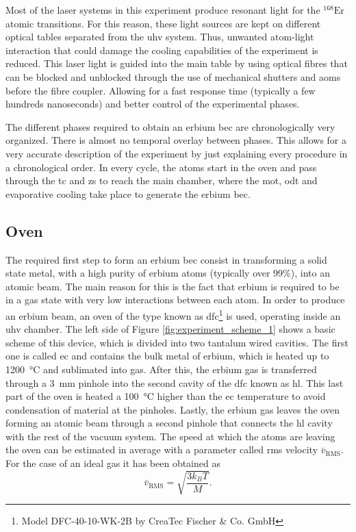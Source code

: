 Most of the laser systems in this experiment produce resonant light for the $^{\text{168}}\text{Er}$ atomic transitions. For this reason, these light sources are kept on different optical tables separated from the \ac{uhv} system. Thus, unwanted atom-light interaction that could damage the cooling capabilities of the experiment is reduced. This laser light is guided into the main table by using optical fibres that can be blocked and unblocked through the use of mechanical shutters and \acp{aom} before the fibre coupler. Allowing for a fast response time (typically a few hundreds nanoseconds) and better control of the experimental phases.

The different phases required to obtain an erbium \ac{bec} are chronologically very organized. There is almost no temporal overlay between phases. This allows for a very accurate description of the experiment by just explaining every procedure in a chronological order. In every cycle, the atoms start in the oven and pass through the \ac{tc} and \acf{zs} to reach the main chamber, where the \ac{mot}, \ac{odt} and evaporative cooling take place to generate the erbium \acl*{bec}.

\subsection{Oven}\label{subsec:oven}

The required first step to form an erbium \ac{bec} consist in transforming a solid state metal, with a high purity of erbium atoms (typically over 99\%), into an atomic beam. The main reason for this is the fact that erbium is required to be in a gas state with very low interactions between each atom. In order to produce an erbium beam, an oven of the type known as \Acf{dfc}\footnote{Model DFC-40-10-WK-2B by CreaTec Fischer \& Co. GmbH} is used, operating inside an \ac{uhv} chamber. The left side of Figure \ref{fig:experiment_scheme_1} shows a basic scheme of this device, which is divided into two tantalum wired cavities. The first one is called \Acf{ec} and contains the bulk metal of erbium, which is heated up to \SI{1200}{\degreeCelsius} and sublimated into gas. After this, the erbium gas is transferred through a \SI{3}{\milli\meter} pinhole into the second cavity of the \ac{dfc} known as \Acf{hl}. This last part of the oven is heated a \SI{100}{\degreeCelsius} higher than the \ac{ec} temperature to avoid condensation of material at the pinholes. Lastly, the erbium gas leaves the oven forming an atomic beam through a second pinhole that connects the \ac{hl} cavity with the rest of the vacuum system. The speed at which the atoms are leaving the oven can be estimated in average with a parameter called \ac{rms} velocity $\bar{v}_\text{RMS}$. For the case of an ideal gas it has been obtained as \cite{Hansch1975}
\begin{equation}\label{eq:rms_velocity}
	\bar{v}_\text{RMS} = \sqrt{\frac{3 k_B T}{M}}.
\end{equation}

